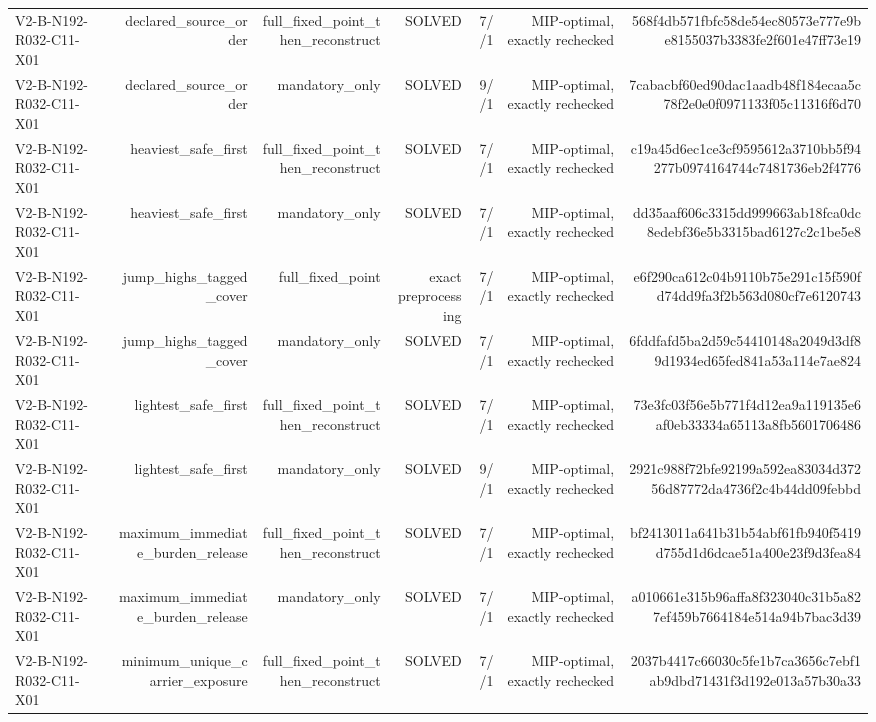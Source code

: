 {\begin{longtable}{lrrrrrr}
V2-B-N192-R032-C11-X01 & declared\_source\_order & full\_fixed\_point\_then\_reconstruct & SOLVED & 7//1 & MIP-optimal, exactly rechecked & 568f4db571fbfc58de54ec80573e777e9be8155037b3383fe2f601e47ff73e19 \\
V2-B-N192-R032-C11-X01 & declared\_source\_order & mandatory\_only & SOLVED & 9//1 & MIP-optimal, exactly rechecked & 7cabacbf60ed90dac1aadb48f184ecaa5c78f2e0e0f0971133f05c11316f6d70 \\
V2-B-N192-R032-C11-X01 & heaviest\_safe\_first & full\_fixed\_point\_then\_reconstruct & SOLVED & 7//1 & MIP-optimal, exactly rechecked & c19a45d6ec1ce3cf9595612a3710bb5f94277b0974164744c7481736eb2f4776 \\
V2-B-N192-R032-C11-X01 & heaviest\_safe\_first & mandatory\_only & SOLVED & 7//1 & MIP-optimal, exactly rechecked & dd35aaf606c3315dd999663ab18fca0dc8edebf36e5b3315bad6127c2c1be5e8 \\
V2-B-N192-R032-C11-X01 & jump\_highs\_tagged\_cover & full\_fixed\_point & exact preprocessing & 7//1 & MIP-optimal, exactly rechecked & e6f290ca612c04b9110b75e291c15f590fd74dd9fa3f2b563d080cf7e6120743 \\
V2-B-N192-R032-C11-X01 & jump\_highs\_tagged\_cover & mandatory\_only & SOLVED & 7//1 & MIP-optimal, exactly rechecked & 6fddfafd5ba2d59c54410148a2049d3df89d1934ed65fed841a53a114e7ae824 \\
V2-B-N192-R032-C11-X01 & lightest\_safe\_first & full\_fixed\_point\_then\_reconstruct & SOLVED & 7//1 & MIP-optimal, exactly rechecked & 73e3fc03f56e5b771f4d12ea9a119135e6af0eb33334a65113a8fb5601706486 \\
V2-B-N192-R032-C11-X01 & lightest\_safe\_first & mandatory\_only & SOLVED & 9//1 & MIP-optimal, exactly rechecked & 2921c988f72bfe92199a592ea83034d37256d87772da4736f2c4b44dd09febbd \\
V2-B-N192-R032-C11-X01 & maximum\_immediate\_burden\_release & full\_fixed\_point\_then\_reconstruct & SOLVED & 7//1 & MIP-optimal, exactly rechecked & bf2413011a641b31b54abf61fb940f5419d755d1d6dcae51a400e23f9d3fea84 \\
V2-B-N192-R032-C11-X01 & maximum\_immediate\_burden\_release & mandatory\_only & SOLVED & 7//1 & MIP-optimal, exactly rechecked & a010661e315b96affa8f323040c31b5a827ef459b7664184e514a94b7bac3d39 \\
V2-B-N192-R032-C11-X01 & minimum\_unique\_carrier\_exposure & full\_fixed\_point\_then\_reconstruct & SOLVED & 7//1 & MIP-optimal, exactly rechecked & 2037b4417c66030c5fe1b7ca3656c7ebf1ab9dbd71431f3d192e013a57b30a33 \\

\end{longtable}}
